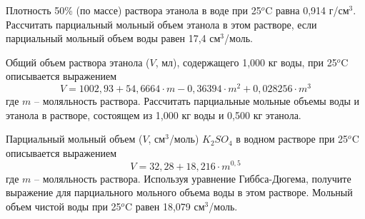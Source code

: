 \begin{Task}
Плотность 50\% (по массе) раствора этанола в воде при 25$^{o}$C равна 0,914 г/см$^{3}$. Рассчитать парциальный мольный объем этанола в этом растворе, если парциальный мольный объем воды равен 17,4 см$^{3}$/моль.
\end{Task}
\begin{Task}
Общий объем раствора этанола ($V$, мл), содержащего 1,000 кг воды, при 25$^{o}$C описывается выражением
$$V = 1002,93 + 54,6664\cdot m-0,36394\cdot m^{2} + 0,028256\cdot m^{3}$$
где $m$ -- моляльность раствора. Рассчитать парциальные мольные объемы воды и этанола в растворе, состоящем из 1,000 кг воды и 0,500 кг этанола.
\end{Task}
\begin{Task}
Парциальный мольный объем ($V$, см$^{3}$/моль) $K_{2}SO_{4}$ в водном растворе при 25$^{o}$C описывается выражением
$$V = 32,28 + 18,216\cdot m^{0,5}$$
где $m$ -- моляльность раствора. Используя уравнение Гиббса-Дюгема, получите выражение для парциального мольного объема воды в этом растворе. Мольный объем чистой воды при 25$^{o}$C равен 18,079 см$^{3}$/моль.
\end{Task}